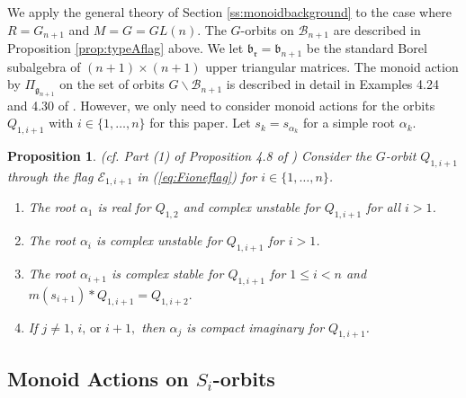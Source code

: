 \documentclass[12pt]{amsart}
\numberwithin{equation}{section}
\newtheorem{prop}[thm]{Proposition}
\newcommand{\fg}{\mbox{${\mathfrak g}$}}
\newcommand{\fr}{\mbox{${\mathfrak r}$}}
\newcommand{\fb}{\mbox{${\mathfrak b}$}}
\newcommand{\B}{\mathcal{B}}
\begin{document}
We apply the general theory of Section \ref{ss:monoidbackground} to the case where $R=G_{n+1}$ and $M=G=GL(n)$.  The $G$-orbits on $\B_{n+1}$ are described in Proposition \ref{prop:typeAflag} above.   We let $\fb_{\fr}=\fb_{n+1}$  be the standard Borel subalgebra of $(n+1)\times (n+1)$ upper triangular matrices.  The monoid action by $\Pi_{\fg_{n+1}}$ on the set of orbits $G\backslash\B_{n+1}$ is described in detail in Examples 4.24 and 4.30 of \cite{CEexp}.  However, we only need to consider monoid actions for the orbits $Q_{1,i+1}$ with $i\in\{1,\dots, n\}$ for this paper. Let $s_k=s_{\alpha_k}$ for a simple root $\alpha_k.$
\begin{prop}\label{p:Kmonoidaction}\emph{(cf. Part (1) of Proposition 4.8 of \cite{CE21I})}
Consider the $G$-orbit $Q_{1,i+1}$ through the flag $\mathcal{E}_{1,i+1}$ in (\ref{eq:Fioneflag}) for $i\in \{1,\dots, n\}$.  
\begin{enumerate}
\item The root $\alpha_{1}$ is real for $Q_{1,2}$ and complex unstable for $Q_{1,i+1}$ for all $i>1$.
\item The root $\alpha_{i}$ is complex unstable for $Q_{1,i+1}$ for $i>1$.
\item The root $\alpha_{i+1}$ is complex stable for $Q_{1,i+1}$ for $1\leq i<n$ and $m(s_{i+1})*Q_{1,i+1}=Q_{1,i+2}.$
\item If $j\neq 1,\,i, \, \text{or } i+1,$ then $\alpha_{j}$ is compact imaginary for $Q_{1,i+1}$.  
\end{enumerate}
\end{prop}

\subsection{Monoid Actions on $S_{i}$-orbits}\label{ss:Simonoid}
\end{document}
